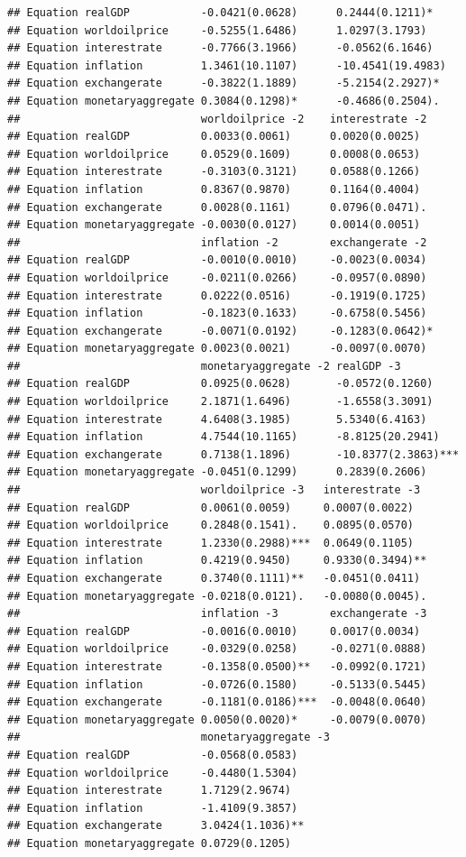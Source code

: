 \documentclass[11pt,preprint, authoryear]{elsarticle}
\numberwithin{equation}{section}
\numberwithin{figure}{section}
\numberwithin{table}{section}
\begin{document}
\begin{verbatim}
## Equation realGDP           -0.0421(0.0628)      0.2444(0.1211)*      
## Equation worldoilprice     -0.5255(1.6486)      1.0297(3.1793)       
## Equation interestrate      -0.7766(3.1966)      -0.0562(6.1646)      
## Equation inflation         1.3461(10.1107)      -10.4541(19.4983)    
## Equation exchangerate      -0.3822(1.1889)      -5.2154(2.2927)*     
## Equation monetaryaggregate 0.3084(0.1298)*      -0.4686(0.2504).     
##                            worldoilprice -2    interestrate -2   
## Equation realGDP           0.0033(0.0061)      0.0020(0.0025)    
## Equation worldoilprice     0.0529(0.1609)      0.0008(0.0653)    
## Equation interestrate      -0.3103(0.3121)     0.0588(0.1266)    
## Equation inflation         0.8367(0.9870)      0.1164(0.4004)    
## Equation exchangerate      0.0028(0.1161)      0.0796(0.0471).   
## Equation monetaryaggregate -0.0030(0.0127)     0.0014(0.0051)    
##                            inflation -2        exchangerate -2    
## Equation realGDP           -0.0010(0.0010)     -0.0023(0.0034)    
## Equation worldoilprice     -0.0211(0.0266)     -0.0957(0.0890)    
## Equation interestrate      0.0222(0.0516)      -0.1919(0.1725)    
## Equation inflation         -0.1823(0.1633)     -0.6758(0.5456)    
## Equation exchangerate      -0.0071(0.0192)     -0.1283(0.0642)*   
## Equation monetaryaggregate 0.0023(0.0021)      -0.0097(0.0070)    
##                            monetaryaggregate -2 realGDP -3          
## Equation realGDP           0.0925(0.0628)       -0.0572(0.1260)     
## Equation worldoilprice     2.1871(1.6496)       -1.6558(3.3091)     
## Equation interestrate      4.6408(3.1985)       5.5340(6.4163)      
## Equation inflation         4.7544(10.1165)      -8.8125(20.2941)    
## Equation exchangerate      0.7138(1.1896)       -10.8377(2.3863)*** 
## Equation monetaryaggregate -0.0451(0.1299)      0.2839(0.2606)      
##                            worldoilprice -3   interestrate -3    
## Equation realGDP           0.0061(0.0059)     0.0007(0.0022)     
## Equation worldoilprice     0.2848(0.1541).    0.0895(0.0570)     
## Equation interestrate      1.2330(0.2988)***  0.0649(0.1105)     
## Equation inflation         0.4219(0.9450)     0.9330(0.3494)**   
## Equation exchangerate      0.3740(0.1111)**   -0.0451(0.0411)    
## Equation monetaryaggregate -0.0218(0.0121).   -0.0080(0.0045).   
##                            inflation -3        exchangerate -3    
## Equation realGDP           -0.0016(0.0010)     0.0017(0.0034)     
## Equation worldoilprice     -0.0329(0.0258)     -0.0271(0.0888)    
## Equation interestrate      -0.1358(0.0500)**   -0.0992(0.1721)    
## Equation inflation         -0.0726(0.1580)     -0.5133(0.5445)    
## Equation exchangerate      -0.1181(0.0186)***  -0.0048(0.0640)    
## Equation monetaryaggregate 0.0050(0.0020)*     -0.0079(0.0070)    
##                            monetaryaggregate -3
## Equation realGDP           -0.0568(0.0583)     
## Equation worldoilprice     -0.4480(1.5304)     
## Equation interestrate      1.7129(2.9674)      
## Equation inflation         -1.4109(9.3857)     
## Equation exchangerate      3.0424(1.1036)**    
## Equation monetaryaggregate 0.0729(0.1205)
\end{verbatim}
\end{document}

